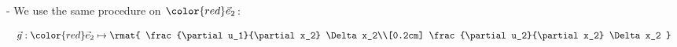 \begin{frame}{\subsubsecname}



\pause

- We use the same procedure on ${\color{red}\vec e_2}$:

\begin{equation}
\vec g: {\color{red}\vec e_2} \mapsto 
\rmat{
\frac{\partial u_1}{\partial x_2} \Delta x_2\\[0.2cm]
\frac{\partial u_2}{\partial x_2} \Delta x_2
}
\end{equation}

\end{frame}


